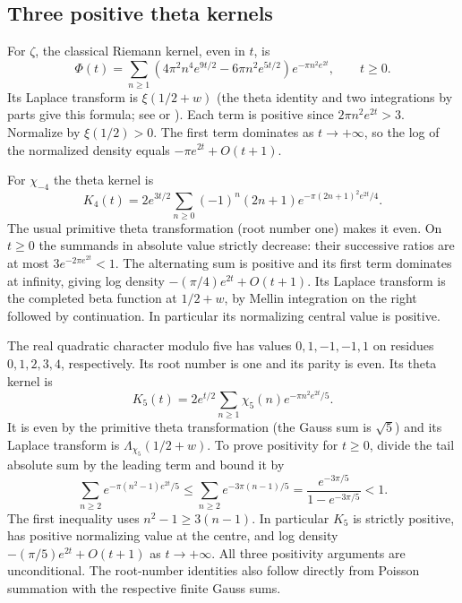 \documentclass[11pt]{article}
\theoremstyle{definition}\newtheorem{definition}[theorem]{Definition}
\theoremstyle{remark}\newtheorem{remark}[theorem]{Remark}
\begin{document}
\subsection{Three positive theta kernels}
For $\zeta$, the classical Riemann kernel, even in $t$, is
\[
 \Phi(t)=\sum_{n\ge1}(4\pi^2n^4e^{9t/2}-6\pi n^2e^{5t/2})e^{-\pi n^2e^{2t}},\qquad t\ge0.
\]
Its Laplace transform is $\xi(1/2+w)$ (the theta identity and two integrations by parts give this formula; see \cite[\S2.16]{titch} or \cite[\texttt{fil:lem:kernels}]{fil}). Each term is positive since $2\pi n^2e^{2t}>3$. Normalize by $\xi(1/2)>0$. The first term dominates as $t\to+\infty$, so the log of the normalized density equals $-\pi e^{2t}+O(t+1)$.

For $\chi_{-4}$ the theta kernel is
\[
 K_4(t)=2e^{3t/2}\sum_{n\ge0}(-1)^n(2n+1)e^{-\pi(2n+1)^2e^{2t}/4}.
\]
The usual primitive theta transformation (root number one) makes it even. On $t\ge0$ the summands in absolute value strictly decrease: their successive ratios are at most $3e^{-2\pi e^{2t}}<1$. The alternating sum is positive and its first term dominates at infinity, giving log density $-(\pi/4)e^{2t}+O(t+1)$. Its Laplace transform is the completed beta function at $1/2+w$, by Mellin integration on the right followed by continuation. In particular its normalizing central value is positive.

The real quadratic character modulo five has values $0,1,-1,-1,1$ on residues $0,1,2,3,4$, respectively. Its root number is one and its parity is even. Its theta kernel is
\[
 K_5(t)=2e^{t/2}\sum_{n\ge1}\chi_5(n)e^{-\pi n^2e^{2t}/5}.
\]
It is even by the primitive theta transformation (the Gauss sum is $\sqrt5$) and its Laplace transform is $\Lambda_{\chi_5}(1/2+w)$. To prove positivity for $t\ge0$, divide the tail absolute sum by the leading term and bound it by
\[
 \sum_{n\ge2}e^{-\pi(n^2-1)e^{2t}/5}
 \le\sum_{n\ge2}e^{-3\pi(n-1)/5}
 =\frac{e^{-3\pi/5}}{1-e^{-3\pi/5}}<1.
\]
The first inequality uses $n^2-1\ge3(n-1)$. In particular $K_5$ is strictly positive, has positive normalizing value at the centre, and log density $-(\pi/5)e^{2t}+O(t+1)$ as $t\to+\infty$. All three positivity arguments are unconditional. The root-number identities also follow directly from Poisson summation with the respective finite Gauss sums.
\end{document}
